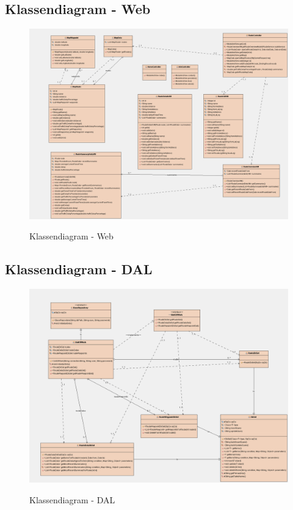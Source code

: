 \documentclass[a4paper]{article}
\begin{document}
\subsection{Klassendiagram - Web}

\begin{figure}[H]
\centering
\includegraphics[width=\textwidth]{Images/kdiawebr.png}\\
\caption{Klassendiagram - Web}
\end{figure}

\subsection{Klassendiagram - DAL}

\begin{figure}[H]
\centering
\includegraphics[width=\textwidth]{Images/kdiadalr.png}\\
\caption{Klassendiagram - DAL}
\end{figure}
\end{document}
